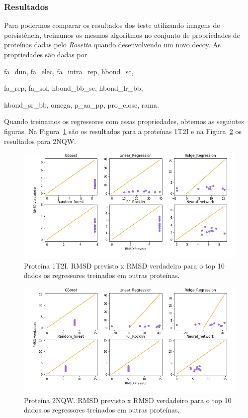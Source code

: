 \subsubsection{Resultados}

Para podermos comparar os resultados dos teste utilizando imagens de persistência, 
treinamos os mesmos algoritmos no conjunto de propriedades de proteínas dadas pelo \textit{Rosetta} 
quando desenvolvendo um novo decoy. As propriedades são dadas por
\begin{center}
    fa\_dun, fa\_elec, fa\_intra\_rep, hbond\_sc,

    fa\_rep, fa\_sol, hbond\_bb\_sc, hbond\_lr\_bb,

    hbond\_sr\_bb, omega, p\_aa\_pp, pro\_close, rama.
\end{center}
Quando treinamos os regressores com essas propriedades, obtemos as seguintes figuras. 
Na Figura~\ref{fig:res1t2i} são os resultados para a proteínas 1T2I e na Figura~\ref{fig:res2nqw} 
os resultados para 2NQW.

\begin{figure}[!htbp]
    \centering
    \includegraphics[width=.7\linewidth]{images/res1t2i.png}
    \caption{Proteína 1T2I. RMSD previsto x RMSD verdadeiro para o top 10 dados os 
             regressores treinados em outras proteínas.}
    \label{fig:res1t2i}
    \fautor
\end{figure}

\begin{figure}[!htbp]
    \centering
    \includegraphics[width=.7\linewidth]{images/res2nqw.png}
    \caption{Proteína 2NQW. RMSD previsto x RMSD verdadeiro para o top 10 dados os 
             regressores treinados em outras proteínas.}
    \label{fig:res2nqw}
    \fautor
\end{figure}

